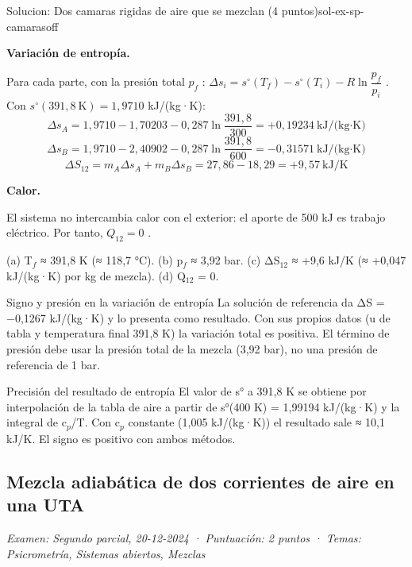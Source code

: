 \documentclass[11pt,a4paper]{article}
\begin{document}
\begin{ocg}{Solucion: Dos camaras rigidas de aire que se mezclan (4 puntos)}{sol-ex-sp-camaras}{off}
\par\medskip\noindent\textbf{Variación de entropía.}\par
Para cada parte, con la presión total  $p_f$ :  $\Delta s_i = s^\circ(T_f) - s^\circ(T_i) - R\ln\dfrac{p_f}{p_i}$ . Con  $s^\circ(391{,}8\ \text{K}) = 1{,}9710$  kJ/(kg·K):  \[\Delta s_A = 1{,}9710 - 1{,}70203 - 0{,}287\ln\frac{391{,}8}{300} = +0{,}19234\ \text{kJ/(kg·K)}\]   \[\Delta s_B = 1{,}9710 - 2{,}40902 - 0{,}287\ln\frac{391{,}8}{600} = -0{,}31571\ \text{kJ/(kg·K)}\]   \[\Delta S_{12} = m_A\Delta s_A + m_B\Delta s_B = 27{,}86 - 18{,}29 = +9{,}57\ \text{kJ/K}\]

\par\medskip\noindent\textbf{Calor.}\par
El sistema no intercambia calor con el exterior: el aporte de 500 kJ es trabajo eléctrico. Por tanto,  $Q_{12} = 0$ .

\begin{resbox}
(a) T$_{f}$ ≈ 391,8 K (≈ 118,7 °C). (b) p$_{f}$ ≈ 3,92 bar. (c) ΔS$_{12}$ ≈ +9,6 kJ/K (≈ +0,047 kJ/(kg·K) por kg de mezcla). (d) Q$_{12}$ = 0.
\end{resbox}

\begin{ojobox}{Signo y presión en la variación de entropía}
La solución de referencia da ΔS = −0,1267 kJ/(kg·K) y lo presenta como resultado. Con sus propios datos (u de tabla y temperatura final 391,8 K) la variación total es positiva. El término de presión debe usar la presión total de la mezcla (3,92 bar), no una presión de referencia de 1 bar.
\end{ojobox}

\begin{ojobox}{Precisión del resultado de entropía}
El valor de s° a 391,8 K se obtiene por interpolación de la tabla de aire a partir de s°(400 K) = 1,99194 kJ/(kg·K) y la integral de c$_{p}$/T. Con c$_{p}$ constante (1,005 kJ/(kg·K)) el resultado sale ≈ 10,1 kJ/K. El signo es positivo con ambos métodos.
\end{ojobox}

\hspace{0pt}\end{ocg}

\subsection{Mezcla adiabática de dos corrientes de aire en una UTA}
\noindent\textit{Examen: Segundo parcial, 20-12-2024 · Puntuación: 2 puntos · Temas: Psicrometría, Sistemas abiertos, Mezclas}\par\medskip
\end{document}
